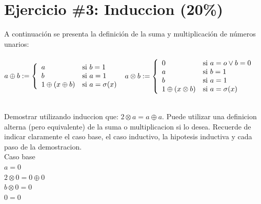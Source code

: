 \documentclass{article}
\begin{document}
\begin{enumerate}
\end{enumerate}





\section*{Ejercicio \#3: Induccion (20\%)}
A continuaci\'on se presenta la definici\'on de la suma y multiplicaci\'on de n\'umeros unarios:\\
\\
\(
a\oplus b := \left\{
 \begin{array}{l l}
            a & \mbox{si } b=1 \\
            b & \mbox{si } a=1 \\
            1\oplus(x\oplus b) & \mbox{si } a=\sigma(x) \\
        \end{array}
        \right.
\)
\(
a\otimes b := \left\{
 \begin{array}{l l}
            0 & \mbox{si } a=o\vee b=0 \\
            a & \mbox{si } b=1 \\
            b & \mbox{si } a=1 \\
            1\oplus(x\otimes b) & \mbox{si } a=\sigma(x) \\
        \end{array}
        \right.

\)\\
\\
\setlength{\parindent}{0cm}

Demostrar utilizando induccion que: \( 2 \otimes a = a \oplus a.\) Puede utilizar una definicion alterna (pero equivalente) de la suma o multiplicacion si lo desea. Recuerde de indicar claramente el caso base, el caso inductivo, la hipotesis inductiva y cada paso de la demostracion.\\ 

Caso base\\
{$a = 0$}\\
{$2\otimes 0 = 0\oplus 0$}\\
{$b\otimes 0 = 0$}\\
{$ 0 = 0$}\\
\end{document}
